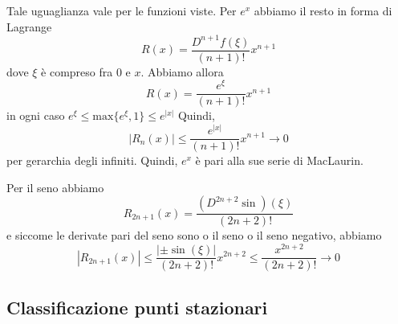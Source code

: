 \documentclass[a4paper]{article}
\begin{document}

Tale uguaglianza vale per le funzioni viste.
Per \(e^x\) abbiamo il resto in forma di Lagrange
\[
    R(x) = \frac{D^{n+1}f(\xi)}{(n+1)!} x^{n+1}
\]
dove \(\xi\) è compreso fra \(0\) e \(x\).
Abbiamo allora
\[
    R(x) = \frac{e^\xi}{(n+1)!}x^{n+1}
\]
in ogni caso \(e^\xi \leq \text{max}\{e^\xi, 1\} \leq e^{|x|}\)
Quindi,
\[
    |R_n(x)| \leq \frac{e^{|x|}}{(n+1)!} x^{n+1} \to 0
\]
per gerarchia degli infiniti.
Quindi, \(e^x\) è pari alla sue serie di MacLaurin.

Per il seno abbiamo
\[
    R_{2n+1}(x) = \frac{(D^{2n+2}\sin)(\xi)}{(2n+2)!}
\]
e siccome le derivate pari del seno sono o il seno o il seno negativo, abbiamo
\[
    |R_{2n+1}(x)| \leq \frac{|\pm\sin(\xi)|}{(2n+2)!}x^{2n+2}
    \leq \frac{x^{2n+2}}{(2n+2)!} \to 0
\]



\subsection{Classificazione punti stazionari}

\end{document}
